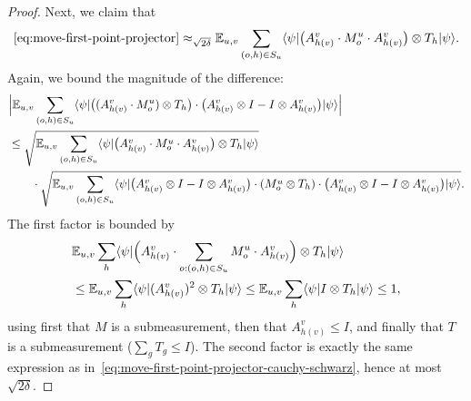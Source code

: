 \begin{proof}
  Next, we claim that
  \begin{equation}\label{eq:move-second-point-projector}
    \eqref{eq:move-first-point-projector}
    \approx_{\sqrt{2\delta}}
    \mathbb{E}_{u,v} \sum_{(o, h) \in S_{u}} \langle \psi \rvert \bigl(A^{v}_{h(v)} \cdot M^{u}_o \cdot A^{v}_{h(v)}\bigr) \otimes T_h  \lvert \psi \rangle.
  \end{equation}
  Again, we bound the magnitude of the difference:
  \begin{align}\label{eq:move-second-point-projector-cauchy-schwarz}
    &\Big|\mathbb{E}_{u,v} \sum_{(o, h) \in S_{u}} \langle \psi \rvert \bigl((A^{v}_{h(v)} \cdot M^{u}_o) \otimes T_h\bigr) \cdot \bigl(A^{v}_{h(v)} \otimes I - I \otimes A^{v}_{h(v)}\bigr)  \lvert \psi \rangle\Big| \notag\\
    &\leq \sqrt{\mathbb{E}_{u,v} \sum_{(o, h) \in S_{u}} \langle \psi \rvert \bigl(A^{v}_{h(v)} \cdot M^{u}_o \cdot A^{v}_{h(v)}\bigr) \otimes T_h  \lvert \psi \rangle} \\
    &\qquad\cdot \sqrt{\mathbb{E}_{u,v} \sum_{(o, h) \in S_{u}} \langle \psi \rvert \bigl(A^{v}_{h(v)} \otimes I - I \otimes A^{v}_{h(v)}\bigr) \cdot (M^{u}_o \otimes T_h) \cdot \bigl(A^{v}_{h(v)} \otimes I - I \otimes A^{v}_{h(v)}\bigr) \lvert \psi \rangle}. \notag
  \end{align}
  The first factor is bounded by
  \begin{align*}
    &\mathbb{E}_{u,v} \sum_h \langle \psi \rvert
      \Bigl(A^v_{h(v)} \cdot \sum_{o:(o,h)\in S_u} M^u_o \cdot A^v_{h(v)}\Bigr)
      \otimes T_h \lvert \psi \rangle \\
    &\le \mathbb{E}_{u,v} \sum_h \langle \psi \rvert (A^v_{h(v)})^2 \otimes T_h \lvert \psi \rangle
      \le \mathbb{E}_{u,v} \sum_h \langle \psi \rvert I \otimes T_h \lvert \psi \rangle
      \le 1,
  \end{align*}
  using first that $M$ is a submeasurement, then that $A^v_{h(v)} \le I$, and
  finally that $T$ is a submeasurement ($\sum_g T_g \le I$). The second factor is
  exactly the same expression
  as in~\eqref{eq:move-first-point-projector-cauchy-schwarz}, hence at most
  $\sqrt{2\delta}$.


\end{proof}
